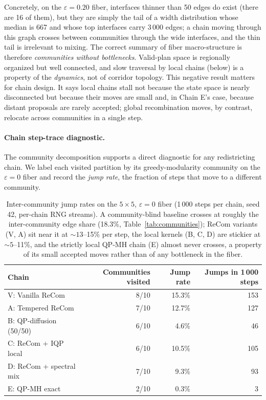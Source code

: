 \documentclass[11pt]{article}
\begin{document}
Concretely, on the $\varepsilon = 0.20$ fiber, interfaces thinner than
50 edges do exist (there are 16 of them), but they are simply the tail
of a width distribution whose median is 667 and whose top interfaces
carry $3\,000$ edges; a chain moving through this graph crosses
between communities through the wide interfaces, and the thin tail is
irrelevant to mixing. The correct summary of fiber macro-structure is
therefore \emph{communities without bottlenecks}. Valid-plan space is
regionally organized but well connected, and slow traversal by local
chains (below) is a property of the \emph{dynamics}, not of corridor
topology. This negative result matters for chain design. It says
local chains stall not because the state space is nearly disconnected
but because their moves are small and, in Chain E's case, because
distant proposals are rarely accepted; global recombination moves, by
contrast, relocate across communities in a single step.

\paragraph{Chain step-trace diagnostic.}\label{sec:fiber-trace}

The community decomposition supports a direct diagnostic for any
redistricting chain. We label each visited partition by its
greedy-modularity community on the $\varepsilon = 0$ fiber and record
the \emph{jump rate}, the fraction of steps that move to a
different community.

\begin{table}[H]
\centering
\small
\begin{tabular}{lrrr}
\toprule
Chain & Communities visited & Jump rate & Jumps in 1\,000 steps \\
\midrule
V: Vanilla ReCom        & 8/10 & 15.3\% & 153 \\
A: Tempered ReCom       & 7/10 & 12.7\% & 127 \\
B: QP-diffusion (50/50) & 6/10 & 4.6\%  & 46  \\
C: ReCom + IQP local    & 6/10 & 10.5\% & 105 \\
D: ReCom + spectral mix & 7/10 & 9.3\%  & 93  \\
E: QP-MH exact          & 2/10 & 0.3\%  & 3   \\
\bottomrule
\end{tabular}
\caption{Inter-community jump rates on the $5 \times 5$,
  $\varepsilon = 0$ fiber (1\,000 steps per chain, seed 42, per-chain
  RNG streams). A community-blind baseline crosses at roughly the
  inter-community edge share (18.3\%,
  Table~\ref{tab:communities}); ReCom variants (V, A) sit near it
  at $\sim 13$--15\% per step, the local kernels (B, C, D) are
  stickier at $\sim 5$--11\%, and the strictly local QP-MH chain (E)
  almost never crosses, a property of its small accepted moves rather
  than of any bottleneck in the fiber.}\label{tab:island-trace}
\end{table}
\end{document}
